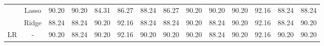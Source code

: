 \begin{landscape}
\begin{table}[]
{\begin{tabular}{cc|cccccccccccc}
				& Lasso                                 & 90.20                                                             & 90.20                                                                & 84.31                                                                & 86.27                                                               & 88.24                                                            & \multicolumn{1}{c|}{86.27}                                                                   & 90.20                                                             & 90.20                                                                & 90.20                                                                & 92.16                                                               & 88.24                                                            & 88.24                                                                   \\ 
				& Ridge                                 & 88.24                                                             & 88.24                                                                & 90.20                                                                & 92.16                                                               & 88.24                                                            & \multicolumn{1}{c|}{88.24}                                                                   & 90.20                                                             & 88.24                                                                & 90.20                                                                & 92.16                                                               & 88.24                                                            & 90.20                                                                   \\ \hline
				\multirow{3}{*}{LR}             & -                                     & 90.20                                                             & 88.24                                                                & 90.20                                                                & 92.16                                                               & 90.20                                                            & \multicolumn{1}{c|}{90.20}                                                                   & 90.20                                                             & 88.24                                                                & 90.20                                                                & 92.16                                                               & 90.20                                                            & 90.20                                                                   \\
				

\end{tabular}}
\end{table}
\end{landscape}
